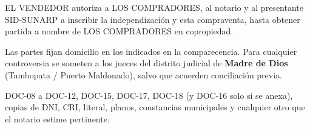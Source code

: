 \documentclass[12pt,a4paper]{article}
\begin{document}
EL VENDEDOR autoriza a LOS COMPRADORES, al notario y al presentante SID-SUNARP a inscribir la independización y esta compraventa, hasta obtener partida a nombre de LOS COMPRADORES en copropiedad.

Las partes fijan domicilio en los indicados en la comparecencia. Para cualquier controversia se someten a los jueces del distrito judicial de \textbf{Madre de Dios} (Tambopata / Puerto Maldonado), salvo que acuerden conciliación previa.

DOC-08 a DOC-12, DOC-15, DOC-17, DOC-18 (y DOC-16 solo si se anexa), copias de DNI, CRI, literal, planos, constancias municipales y cualquier otro que el notario estime pertinente.

\CierreMinuta
\LugarFecha

\vspace{0.15em}

\vspace{0.7em}
\noindent
{}
\end{document}
